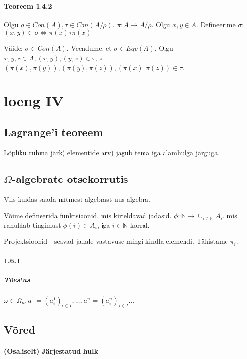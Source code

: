 \documentclass[12pt]{report}
\numberwithin{equation}{section}
\theoremstyle{definition}
\theoremstyle{plain}
\begin{document}
\paragraph{Teoreem 1.4.2}

Olgu $\rho \in Con(A), \tau \in Con(A / \rho)$. $\pi : A \rightarrow A / \rho$. Olgu $x,y \in A$.  Defineerime $\sigma$: $(x,y) \in \sigma \iff \pi(x) \tau \pi(x)$

Väide: $\sigma \in Con(A)$. Veendume, et $\sigma \in Eqv(A)$. Olgu $x,y,z \in A, (x,y), (y,z) \in \tau$, st. $(\pi(x),\pi(y)), (\pi(y),\pi(z)), (\pi(x),\pi(z)) \in \tau$.


\section{loeng IV}

\subsection{Lagrange'i teoreem}

Lõpliku rühma järk( elementide arv) jagub tema iga alamhulga järguga.

\subsection{$\Omega$-algebrate otsekorrutis}

Viis kuidas saada mitmest algebrast uus algebra.

Võime defineerida funktsioonid, mis kirjeldavad jadasid. $ \phi : \mathbb{N} \rightarrow \cup_{i \in \mathbb{N}} A_i$, mis rahuldab tingimust $ \phi (i) \in A_i$, iga $i \in \mathbb{N}$ korral.

Projektsioonid - seavad jadale vastavuse mingi kindla elemendi. Tähistame $\pi _ i$. 

\paragraph{ 1.6.1}

\subparagraph{Tõestus}
$\omega \in \Omega_n, a^1 = (a_i^1)_{i \in I},..., a^n = (a_i^n)_{i \in I} ...$ 

\subsection{Võred}

\paragraph{(Osaliselt) Järjestatud hulk} 
\end{document}
